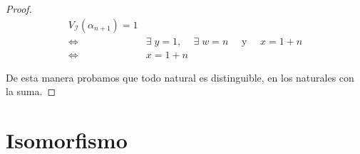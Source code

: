 \begin{itemize}
\begin{proof}
            \begin{align*}
                V_{\mathcal{I}}(\alpha_{n+1}) = 1 \\
                \iff & \exists\; y = 1 \text{, } 
                \quad \exists \; w = n 
                \quad \text{ y } 
                \quad x = 1 + n \\
                \iff & x = 1 + n
            \end{align*}

            De esta manera probamos que todo natural es distinguible,
            en los naturales con la suma.

        \end{proof}
\end{itemize}

\section{Isomorfismo}


